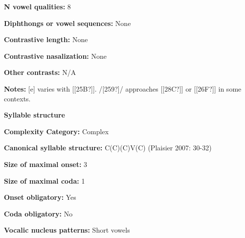 \begin{styleBody}
\textbf{N vowel qualities:} 8
\end{styleBody}

\begin{styleBody}
\textbf{Diphthongs or vowel sequences:} None
\end{styleBody}

\begin{styleBody}
\textbf{Contrastive length:} None
\end{styleBody}

\begin{styleBody}
\textbf{Contrastive nasalization:} None
\end{styleBody}

\begin{styleBody}
\textbf{Other contrasts:} N/A
\end{styleBody}

\begin{styleBody}
\textbf{Notes:} [e] varies with [[25B?]]. /[259?]/ approaches [[28C?]] or [[26F?]] in some contexts.
\end{styleBody}

\begin{styleBody}
\textbf{Syllable structure}
\end{styleBody}

\begin{styleBody}
\textbf{Complexity Category:} Complex
\end{styleBody}

\begin{styleBody}
\textbf{Canonical syllable structure:} C(C)(C)V(C)\textbf{ }(Plaisier 2007: 30-32)
\end{styleBody}

\begin{styleBody}
\textbf{Size of maximal onset:} 3
\end{styleBody}

\begin{styleBody}
\textbf{Size of maximal coda:} 1
\end{styleBody}

\begin{styleBody}
\textbf{Onset obligatory:} Yes
\end{styleBody}

\begin{styleBody}
\textbf{Coda obligatory:} No
\end{styleBody}

\begin{styleBody}
\textbf{Vocalic nucleus patterns:} Short vowels
\end{styleBody}

